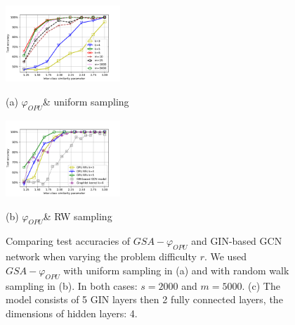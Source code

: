 \documentclass{article}
\begin{document}
\begin{figure}[h]
%
\begin{minipage}[b]{.48\linewidth}
  \centering
  \centerline{\includegraphics[width=4.3cm]{figs/LightOn_adj_SBM_Similarity_graphlet_size.pdf}}
  \centerline{(a) $\varphi_{OPU}$\& uniform sampling}\medskip
\end{minipage}
\hfill
\begin{minipage}[b]{0.48\linewidth}
  \centering
  \centerline{\includegraphics[width=4.3cm]{figs/LightOn_adj_SBM_similarity_graphlet_size_RW.pdf}}
  \centerline{(b) $\varphi_{OPU}$\& RW sampling}\medskip
\end{minipage}
%
\caption{Comparing test accuracies of $GSA-\varphi_{OPU}$ and GIN-based GCN network when varying the problem difficulty $r$. We used $GSA-\varphi_{OPU}$ with uniform sampling in (a) and with random walk sampling in (b). In both cases: $s=2000$ and $m=5000$. (c) The model consists of 5 GIN layers then 2 fully connected layers, the dimensions of hidden layers: 4.}
\label{fig:GCN}
%
\end{figure}
\end{document}
